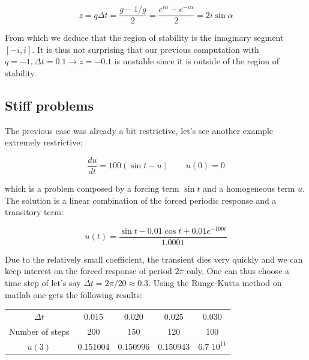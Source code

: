 \begin{equation}
z = q\Delta t= \frac{g - 1/g}{2} = \frac{e^{i\alpha} - e^{-i\alpha}}{2} = 2 i \sin \alpha
\end{equation}

From which we deduce that the region of stability is the imaginary segment $[-i, i]$. It is thus not surprising that our previous computation with $q= -1, \Delta t = 0.1 \rightarrow z = -0.1$ is unstable since it is outside of the region of stability. 

\subsection{Stiff problems}
The previous case was already a bit restrictive, let's see another example extremely restrictive: 

\begin{equation}
\frac{d u}{dt} = 100 (\sin t - u) \qquad u(0)= 0
\end{equation} 

which is a problem composed by a forcing term $\sin t$ and a homogeneous term $u$. The solution is a linear combination of the forced periodic response and a transitory term: 

\begin{equation}
u(t) = \frac{\sin t - 0.01 \cos t + 0.01 e^{-100t}}{1.0001}
\end{equation}

Due to the relatively small coefficient, the transient dies very quickly and we can keep interest on the forced response of period $2\pi$ only. One can thus choose a time step of let's say $\Delta t = 2\pi/20 \approx 0.3$. Using the Runge-Kutta method on matlab one gets the following results: 

\begin{center}
\begin{tabular}{ccccc}
\hline 
$\Delta t$ & 0.015 & 0.020 & 0.025 & 0.030\\
Number of steps & 200 & 150 & 120 & 100\\
$u(3)$ & 0.151004 & 0.150996 & 0.150943 & 6.7 $10^{11}$\\
\hline 
\end{tabular}
\end{center}

